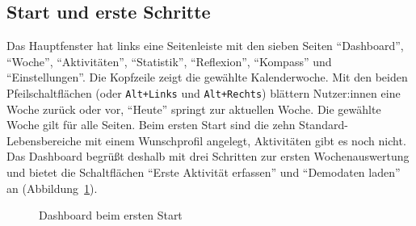 \subsection{Start und erste Schritte}
Das Hauptfenster hat links eine Seitenleiste mit den sieben Seiten \enquote{Dashboard}, \enquote{Woche}, \enquote{Aktivitäten}, \enquote{Statistik}, \enquote{Reflexion}, \enquote{Kompass} und \enquote{Einstellungen}. Die Kopfzeile zeigt die gewählte Kalenderwoche. Mit den beiden Pfeilschaltflächen (oder \texttt{Alt+Links} und \texttt{Alt+Rechts}) blättern Nutzer:innen eine Woche zurück oder vor, \enquote{Heute} springt zur aktuellen Woche. Die gewählte Woche gilt für alle Seiten. Beim ersten Start sind die zehn Standard-Lebensbereiche mit einem Wunschprofil angelegt, Aktivitäten gibt es noch nicht. Das Dashboard begrüßt deshalb mit drei Schritten zur ersten Wochenauswertung und bietet die Schaltflächen \enquote{Erste Aktivität erfassen} und \enquote{Demodaten laden} an (Abbildung~\ref{abb:anleitung-start}).

\begin{figure}[H]
  \caption{Dashboard beim ersten Start}\label{abb:anleitung-start}
  \centering
\end{figure}

